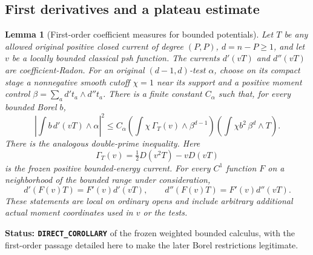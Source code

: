 \documentclass[11pt,a4paper]{article}
\numberwithin{equation}{section}
\newtheorem{lemma}[theorem]{Lemma}
\theoremstyle{definition}
\theoremstyle{remark}
\begin{document}
\subsection{First derivatives and a plateau estimate}

\begin{lemma}[First-order coefficient measures for bounded potentials]
\label{lem:r11-bounded-first-order}
Let $T$ be any allowed original positive closed current of degree
$(P,P)$, $d=n-P\geq1$, and let $v$ be a locally bounded classical
psh function.  The currents $d'(vT)$ and $d''(vT)$ are coefficient-Radon.
For an original $(d-1,d)$-test $\alpha$, choose on its compact stage a
nonnegative smooth cutoff $\chi=1$ near its support and a positive
moment control $\beta=\sum_a d't_a\wedge d''t_a$.  There is a finite
constant $C_\alpha$ such that, for every bounded Borel $b$,
\[
 \left|\int b\,d'(vT)\wedge\alpha\right|^2
 \leq C_\alpha
 \left(\int\chi\,\Gamma_T(v)\wedge\beta^{d-1}\right)
 \left(\int\chi b^2\,\beta^d\wedge T\right).
 \tag{NP1}
\]
There is the analogous double-prime inequality.  Here
\[
 \Gamma_T(v)=\tfrac12D(v^2T)-vD(vT)
\]
is the frozen positive bounded-energy current.  For every $C^1$
function $F$ on a neighborhood of the bounded range under consideration,
\[
 d'(F(v)T)=F'(v)d'(vT),\qquad
 d''(F(v)T)=F'(v)d''(vT).
 \tag{NP2}
\]
These statements are local on ordinary opens and include arbitrary
additional actual moment coordinates used in $v$ or the tests.
\end{lemma}

\noindent\textbf{Status: \texttt{DIRECT\_COROLLARY}} of the
frozen weighted bounded calculus, with the first-order passage detailed
here to make the later Borel restrictions legitimate.
\end{document}
